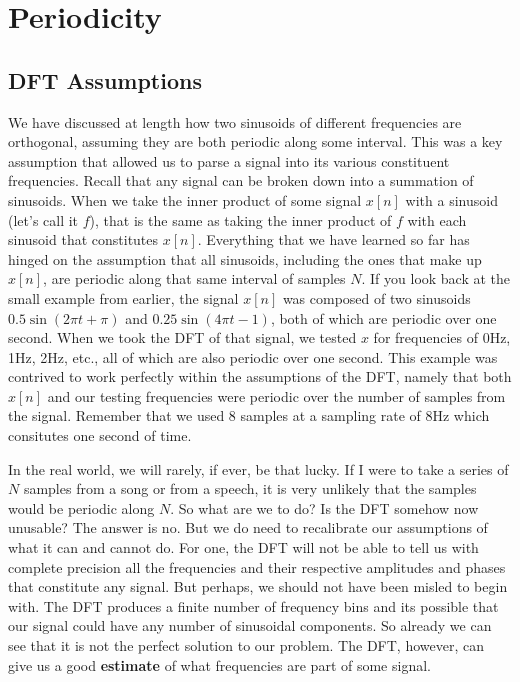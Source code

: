 \section*{Periodicity}

\subsection*{DFT Assumptions}

We have discussed at length how two sinusoids of different frequencies are orthogonal, assuming they
are both periodic along some interval.  This was a key assumption that allowed us to parse a signal into 
its various constituent frequencies.  Recall that any signal can be broken down into a summation of sinusoids.  
When we take the inner product of some signal $x[n]$ with
a sinusoid (let's call it $f$), that is the same as taking the inner product of $f$ with each sinusoid that
constitutes $x[n]$.  Everything that we have learned so far has hinged on the assumption that all sinusoids, 
including the ones that make up $x[n]$, are periodic along that same interval of samples $N$.  If you look back
at the small example from earlier, the signal $x[n]$ was composed of two sinusoids $0.5\sin(2\pi t + \pi)$
and $0.25\sin(4\pi t - 1)$, both of which are periodic over one second.  When we took the DFT of that signal,
we tested $x$ for frequencies of 0Hz, 1Hz, 2Hz, etc., all of which are also periodic over one second.  This
example was contrived to work perfectly within the assumptions of the DFT, namely that both $x[n]$ and
our testing frequencies were periodic over the number of samples from the signal.  Remember that we used
8 samples at a sampling rate of 8Hz which consitutes one second of time.

In the real world, we will rarely, if ever, be that lucky.  If I were to take a series of $N$ samples from a song
or from a speech, it is very unlikely that the samples would be periodic along $N$.  So what are we to do?  Is the
DFT somehow now unusable?  The answer is no.  But we do need to recalibrate our assumptions of what
it can and cannot do.  For one, the DFT will not be able to tell us with complete precision all the frequencies
and their respective amplitudes and phases that constitute any signal.  But perhaps, we should not have 
been misled to begin with.  The DFT produces a finite number of frequency bins and its possible
that our signal could have any number of sinusoidal components.  So already we can see that it is not
the perfect solution to our problem.  The DFT, however, can give us a good \textbf{estimate} of what 
frequencies are part of some signal.

